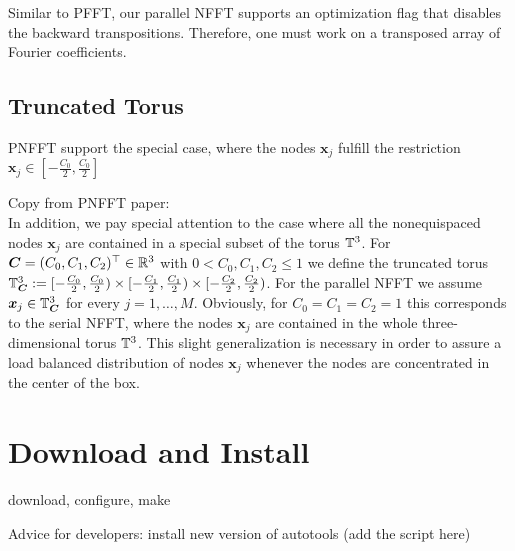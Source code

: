 Similar to PFFT, our parallel NFFT supports an optimization flag that disables the backward transpositions. Therefore, one must work on a transposed array of Fourier coefficients.


\subsection{Truncated Torus}
PNFFT support the special case, where the nodes $\mathbf x_j$ fulfill the restriction $\mathbf x_j \in \left[-\frac{C_0}{2},\frac{C_0}{2} \right]$

Copy from PNFFT paper:\\
In addition, we pay special attention to the case where all the nonequispaced nodes $\mathbf x_j$
are contained in a special subset of the torus $\mathbb{T}^3$. For $\boldsymbol{C}=(C_0,C_1,C_2)^\top\in\mathbb{R}^3$ with $0<C_0,C_1,C_2\le 1$
we define the truncated torus $\mathbb{T}^3_{\boldsymbol{C}} := [-\frac{C_0}{2},\frac{C_0}{2})\times [-\frac{C_1}{2},\frac{C_1}{2}) \times [-\frac{C_2}{2},\frac{C_2}{2})$.
For the parallel NFFT we assume $\boldsymbol{x}_j\in\mathbb{T}^3_{\boldsymbol{C}}$ for every $j=1,\hdots,M$.
Obviously, for $C_0=C_1=C_2=1$ this corresponds to the serial NFFT, where the nodes $\mathbf x_j$ are contained in the whole three-dimensional torus $\mathbb{T}^3$.
This slight generalization is necessary in order to assure a load balanced distribution of nodes $\mathbf x_j$ whenever the nodes are
concentrated in the center of the box.


\section{Download and Install}
\begin{compactitem}
  \item download, configure, make
  \item Advice for developers: install new version of autotools (add the script here)
\end{compactitem}





